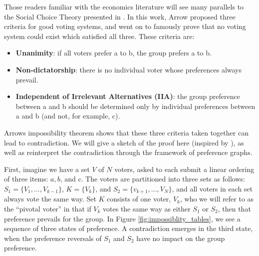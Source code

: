 Those readers familiar with the economics literature will see many parallels to the Social Choice Theory presented in \cite{arrow}.
In this work, Arrow proposed three criteria for good voting systems, and went on to famously prove that no voting system could exist which satisfied all three.
These criteria are:

\begin{itemize}
	\item \textbf{Unanimity}: if all voters prefer a to b, the group prefers a to b.
	\item \textbf{Non-dictatorship}: there is no individual voter whose preferences always prevail.
	\item \textbf{Independent of Irrelevant Alternatives (IIA)}: the group preference between a and b should be determined only by individual preferences between a and b (and not, for example, c).
\end{itemize}

Arrows impossibility theorem shows that these three criteria taken together can lead to contradiction.
We will give a sketch of the proof here (inspired by \cite{geanakoplos:2005}), as well as reinterpret the contradiction through the framework of preference graphs.

\bigskip

First, imagine we have a set $V$ of $N$ voters, asked to each submit a linear ordering of three items: $a, b$, and $c$.
The voters are partitioned into three sets as follows: $S_1 = \{V_1, ..., V_{k-1}\}$, $K = \{V_k\}$, and $S_2 = \{v_{k+1}, ..., V_N\}$, and all voters in each set always vote the same way.
Set $K$ consists of one voter, $V_k$, who we will refer to as the ``pivotal voter'' in that if $V_k$ votes the same way as either $S_1$ or $S_2$, then that preference prevails for the group.
In Figure \ref{fig:impossiblity_tables}, we see a sequence of three states of preference.
A contradiction emerges in the third state, when the preference reversals of $S_1$ and $S_2$ have no impact on the group preference.

